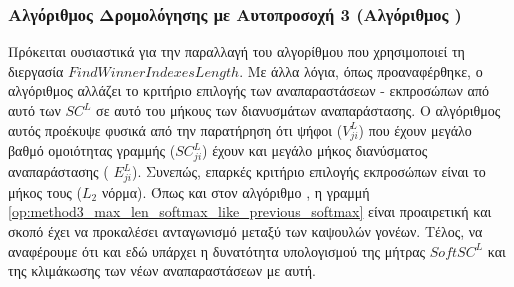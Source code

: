 \subsubsection{Αλγόριθμος Δρομολόγησης με Αυτο\textendash προσοχή 3 (Αλγόριθμος )}
Πρόκειται ουσιαστικά για την παραλλαγή του αλγορίθμου  που χρησιμοποιεί τη διεργασία $FindWinnerIndexesLength$. Με άλλα λόγια, όπως προαναφέρθηκε, ο αλγόριθμος  αλλάζει το κριτήριο επιλογής των αναπαραστάσεων - εκπροσώπων από αυτό των $SC^L$ σε αυτό του μήκους των διανυσμάτων αναπαράστασης. Ο αλγόριθμος αυτός προέκυψε φυσικά από την παρατήρηση ότι ψήφοι ($V^L_{ji}$) που έχουν μεγάλο βαθμό ομοιότητας γραμμής ($SC^L_{ji}$) έχουν και μεγάλο μήκος διανύσματος αναπαράστασης ( $E^L_{ji}$). Συνεπώς, επαρκές κριτήριο επιλογής εκπροσώπων είναι το μήκος τους ($L_2$ νόρμα). Όπως και στον αλγόριθμο , η γραμμή \ref{op:method3_max_len_softmax_like_previous_softmax} είναι προαιρετική και σκοπό έχει να προκαλέσει ανταγωνισμό μεταξύ των καψουλών γονέων. Τέλος, να αναφέρουμε ότι και εδώ υπάρχει η δυνατότητα υπολογισμού της μήτρας $SoftSC^L$ και της κλιμάκωσης των νέων αναπαραστάσεων με αυτή.


